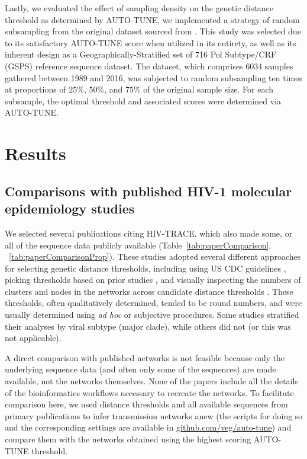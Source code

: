 \documentclass[utf8]{FrontiersinHarvard} %
\begin{document}
Lastly, we evaluated the effect of sampling density on the genetic distance
threshold as determined by AUTO-TUNE, we implemented a strategy of random
subsampling from the original dataset sourced from \citep{rhee_national_2019}.
This study was selected due to its satisfactory AUTO-TUNE score when utilized
in its entirety, as well as its inherent design as a Geographically-Stratified
set of 716 Pol Subtype/CRF (GSPS) reference sequence dataset. The dataset,
which comprises 6034 samples gathered between 1989 and 2016, was subjected to
random subsampling ten times at proportions of $25\%$, $50\%$, and $75\%$ of
the original sample size. For each subsample, the optimal threshold and
associated scores were determined via AUTO-TUNE.

\section{Results}

\subsection{Comparisons with published HIV-1 molecular epidemiology studies}

We selected several publications citing HIV-TRACE, which also made some, or all
of the sequence data publicly available (Table~\ref{tab:paperComparison},
~\ref{tab:paperComparisonProp}). These studies adopted several different
approaches for selecting genetic distance thresholds, including using US CDC
guidelines \citep{yan_central_2020}, picking thresholds based on prior studies
\citep{sivay_hiv-1_2018}, and visually inspecting the numbers of clusters and
nodes in the networks across candidate distance thresholds
\citep{liu_dynamics_2020}. These thresholds, often qualitatively determined,
tended to be round numbers, and were usually determined using {\it ad hoc} or
subjective procedures. Some studies stratified their analyses by viral subtype
(major clade), while others did not (or this was not applicable).

A direct comparison with published networks is not feasible because only the
underlying sequence data (and often only some of the sequences) are made
available, not the networks themselves. None of the papers include all the
details of the bioinformatics workflows necessary to recreate the networks. To
facilitate comparison here, we used distance thresholds and all available
sequences from primary publications to infer transmission networks anew (the
scripts for doing so and the corresponding settings are available in
\url{github.com/veg/auto-tune}) and compare them with the networks obtained
using the highest scoring AUTO-TUNE threshold.
\end{document}

